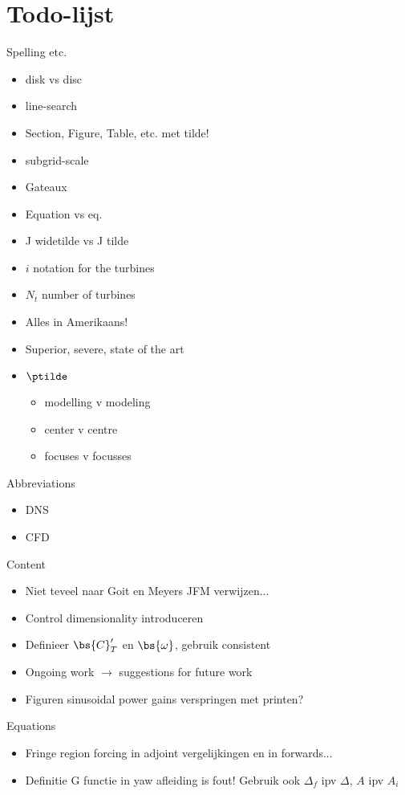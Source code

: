 \chapter{Todo-lijst}

Spelling etc.
\begin{itemize}
	\item disk vs disc
	\item line-search
	\item Section, Figure, Table, etc. met tilde!
	\item subgrid-scale
	\item Gateaux
	\item Equation vs eq.
	\item J widetilde vs J tilde
	\item $i$ notation for the turbines
	\item $N_t$ number of turbines
	\item Alles in Amerikaans! 
	\item Superior, severe, state of the art
	\item $\ptilde$
	\begin{itemize}
		\item modelling v modeling
		\item center v centre
		\item focuses v focusses
	\end{itemize}
\end{itemize}

Abbreviations
\begin{itemize}
	\item DNS
	\item CFD
\end{itemize}

Content
\begin{itemize}
	\item Niet teveel naar Goit en Meyers JFM verwijzen...
	\item Control dimensionality introduceren
	\item Definieer $\bs{C}_T'$ en $\bs{\omega}$, gebruik consistent
	\item Ongoing work $\rightarrow$ suggestions for future work
	\item Figuren sinusoidal power gains verspringen met printen?
\end{itemize}

Equations
\begin{itemize}
	\item Fringe region forcing in adjoint vergelijkingen en in forwards...
	\item Definitie G functie in yaw afleiding is fout! Gebruik ook $\Delta_f$ ipv $\Delta$, $A$ ipv $A_i$
\end{itemize}

\cleardoublepage
